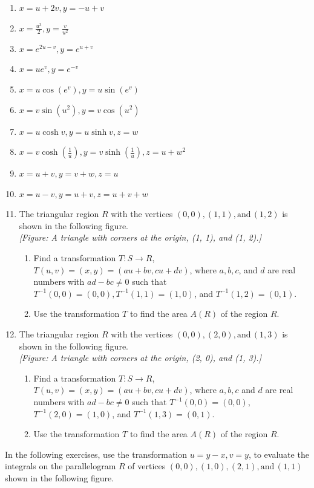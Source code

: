 \documentclass{exercises}
\begin{document}
\begin{enumerate}[resume]
\item $x=u+2v,y=-u+v$
\item $x=\frac{u^{3}}{2},y=\frac{v}{u^{2}}$
\item $x=e^{2u-v},y=e^{u+v}$
\item $x=ue^{v},y=e^{-v}$
\item $x=u\cos(e^{v}),y=u\sin(e^{v})$
\item $x=v\sin(u^{2}),y=v\cos(u^{2})$
\item $x=u\cosh v,y=u\sinh v,z=w$
\item $x=v\cosh(\frac{1}{u}),y=v\sinh(\frac{1}{u}),z=u+w^{2}$
\item $x=u+v,y=v+w,z=u$
\item $x=u-v,y=u+v,z=u+v+w$
\item The triangular region $R$ with the vertices $(0,0),(1,1),\text{and}\,(1,2)$ is shown in the following figure. \\ \textit{[Figure: A triangle with corners at the origin, (1, 1), and (1, 2).]}
\begin{enumerate}[label=(\alph*)]
  \item Find a transformation $T:S\to R$, $T(u,v)=(x,y)=(au+bv,cu+dv)$, where $a,b,c$, and $d$ are real numbers with $ad-bc\ne0$ such that $T^{-1}(0,0)=(0,0),T^{-1}(1,1)=(1,0)$, and $T^{-1}(1,2)=(0,1)$.
  \item Use the transformation $T$ to find the area $A(R)$ of the region $R$.
\end{enumerate}
\item The triangular region $R$ with the vertices $(0,0),(2,0),\text{and}\,(1,3)$ is shown in the following figure. \\ \textit{[Figure: A triangle with corners at the origin, (2, 0), and (1, 3).]}
\begin{enumerate}[label=(\alph*)]
  \item Find a transformation $T:S\to R$, $T(u,v)=(x,y)=(au+bv,cu+dv)$, where $a,b,c$ and $d$ are real numbers with $ad-bc\ne0$ such that $T^{-1}(0,0)=(0,0)$, $T^{-1}(2,0)=(1,0)$, and $T^{-1}(1,3)=(0,1)$.
  \item Use the transformation $T$ to find the area $A(R)$ of the region $R$.
\end{enumerate}
\end{enumerate}

In the following exercises, use the transformation $u=y-x,v=y$, to evaluate the integrals on the parallelogram $R$ of vertices $(0,0),(1,0),(2,1),\text{and}\,(1,1)$ shown in the following figure.
\end{document}
